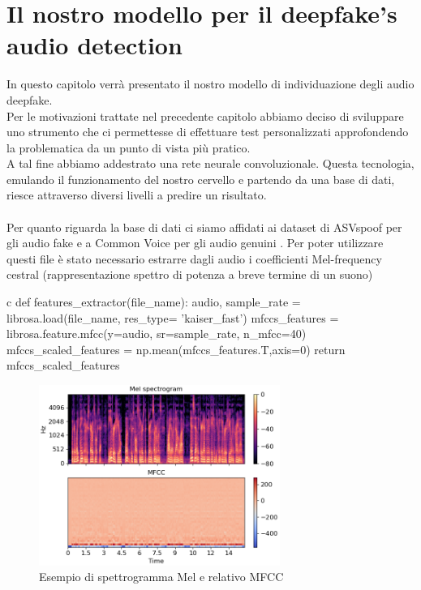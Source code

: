 \documentclass[12pt, a4paper]{article}
\begin{document}
\section{Il nostro modello per il deepfake's audio detection}
In questo capitolo verrà presentato il nostro modello di individuazione degli audio deepfake. \\
Per le motivazioni trattate nel precedente capitolo abbiamo deciso di sviluppare uno strumento che ci permettesse di effettuare test personalizzati approfondendo la problematica da un punto di vista più pratico.\\
A tal fine abbiamo addestrato una rete neurale convoluzionale. Questa tecnologia, emulando il funzionamento del nostro cervello e partendo da una base di dati, riesce attraverso diversi livelli a predire un risultato. \\\\
Per quanto riguarda la base di dati ci siamo affidati ai dataset di ASVspoof per gli audio fake \cite{FakeAudioDataset} e a Common Voice per gli audio genuini \cite{RealAudioDataset}.
Per poter utilizzare questi file è stato necessario estrarre dagli audio i coefficienti Mel-frequency cestral (rappresentazione spettro di potenza a breve termine di un suono)\\
\begin{code}
\label{code:python-code}
\begin{pythoncode}{c}
def features_extractor(file_name):
    audio, sample_rate = librosa.load(file_name, res_type= 'kaiser_fast') 
    mfccs_features = librosa.feature.mfcc(y=audio, sr=sample_rate, n_mfcc=40)
    mfccs_scaled_features = np.mean(mfccs_features.T,axis=0) 
    return mfccs_scaled_features  
\end{pythoncode}
\end{code}
\begin{figure}[h]
    \centering
    \includegraphics[width=0.7\textwidth]{img/librosa-feature-mfcc-1_00.png}
    \caption{Esempio di spettrogramma Mel e relativo MFCC }
\end{figure} 
\end{document}
